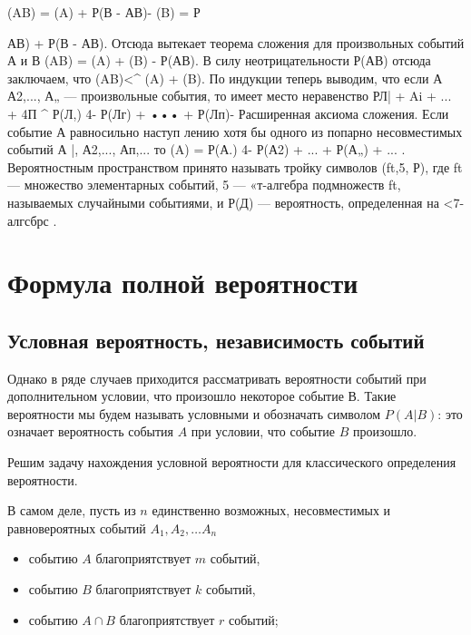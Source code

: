 \bbP(A\cup B) = \bbP(A) + Р(В - АВ)- \bbP(B) = Р{АВ) + Р(В - АВ).
Отсюда вытекает теорема сложения для произвольных событий А и В
\bbP(A\cup B) = \bbP(A) + \bbP(B) - Р(АВ).
В силу неотрицательности Р(АВ) отсюда заключаем, что
\bbP(A\cup B)<^ \bbP(A) + \bbP(B).
По индукции теперь выводим, что если А\, А2,..., А„ — произвольные события, то имеет место неравенство
Р{Л| + Ai + ... + 4П} ^ Р(Л,) 4- Р(Лг) + ••• + Р(Лп)-
Расширенная аксиома сложения. Если событие А равносильно наступ лению хотя бы одного из попарно несовместимых событий А |, А2,..., Ап,... то
\bbP(A) = Р(А.) 4- Р(А2) + ... + Р(А„) + ... .
Вероятностным пространством принято называть тройку символов (ft,5, Р), где ft — множество элементарных событий, 5 — «т-алгебра подмножеств ft, называемых случайными событиями, и Р(Д) — вероятность, определенная на <7-алгсбрс .

\section{Формула полной вероятности}
\subsection{Условная вероятность, независимость событий}

Однако в ряде случаев приходится рассматривать вероятности событий при дополнительном условии, что произошло некоторое событие В. Такие вероятности мы будем называть условными и обозначать символом $P(A|B)$: это означает вероятность события $A$ при условии, что событие $B$ произошло.
 
Решим задачу нахождения условной вероятности для классического определения вероятности.

В самом деле, пусть из $n$ единственно возможных, несовместимых и равновероятных событий $A_1,A_2,\dots A_n$
\begin{itemize}
\item событию $A$ благоприятствует $m$ событий, 
\item событию $B$ благоприятствует $k$ событий,
\item событию $A\cap B$ благоприятствует $r$ событий;
\end{itemize}

}
